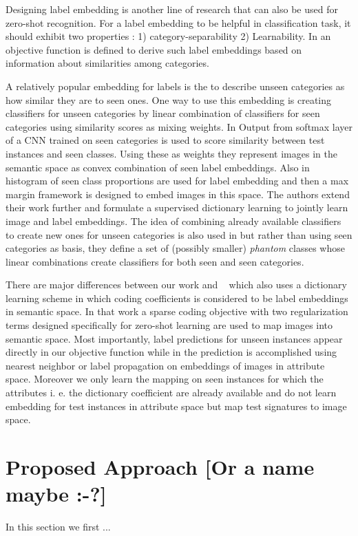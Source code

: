 \documentclass[10pt,twocolumn,letterpaper]{article}
\begin{document}
 Designing label embedding is another line of research that can also be used for zero-shot recognition. For a label embedding to be helpful in classification task,
 it should exhibit two properties \cite{Yu2013}: 1) category-separability 2) Learnability. In \cite{Yu2013} an objective function is defined to derive
 such label embeddings based on information about similarities among categories.

A relatively popular embedding for labels is the to describe unseen categories as how similar they are to seen ones.
One way to use this embedding is creating classifiers for unseen categories by linear combination of
classifiers for seen categories using similarity scores as mixing weights.
In \cite{convex} Output from softmax layer of a CNN trained on seen categories is used to score similarity between test instances and seen classes.
Using these as weights they represent images in the semantic space as convex combination of seen label embeddings.
Also in  \cite{sse} histogram of seen class proportions are used for label embedding and then a max margin framework is designed to embed images
 in this space. The authors extend their work further \cite{agnostic} and formulate a supervised dictionary learning
 to jointly learn image and label embeddings.
 The idea of combining already available classifiers to create new ones for unseen categories is also used in \cite{Synthesized}
 but rather than using seen categories as basis, they define a set of (possibly smaller) \textit{phantom} classes whose linear combinations
 create classifiers for both seen and seen categories. 


There are major differences between our work and  ~\cite{Kodirov2015} which also uses a dictionary learning scheme in which coding coefficients is considered to be
 label embeddings in semantic space. In that work a sparse coding objective with two regularization terms designed specifically for
 zero-shot learning are used to map images into semantic space. Most importantly, label predictions
 for unseen instances appear directly in our objective function while in \cite{Kodirov2015} the prediction is accomplished using
 nearest neighbor or label propagation on embeddings of images in attribute space. Moreover we only learn the mapping
 on seen instances for which the attributes i. e. the dictionary coefficient are already available and
 do not learn embedding for test instances in attribute space but map test signatures to image space.

\section{Proposed Approach [Or a name maybe :-?]} \label{proposed}
In this section we first ...
\end{document}
